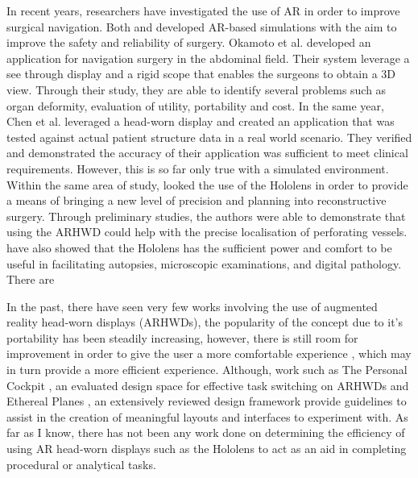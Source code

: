 In recent years, researchers have investigated the use of AR in order to improve surgical navigation. Both \cite{Okamoto2015} and \cite{Chen2015} developed AR-based simulations with the aim to improve the safety and reliability of surgery. Okamoto et al. developed an application for navigation surgery in the abdominal field. Their system leverage a see through display and a rigid scope that enables the surgeons to obtain a 3D view. Through their study, they are able to identify several problems such as organ deformity, evaluation of utility, portability and cost. In the same year, Chen et al. leveraged a head-worn display and created an application that was tested against actual patient structure data in a real world scenario. They verified and demonstrated the accuracy of their application was sufficient to meet clinical requirements. However, this is so far only true with a simulated environment. Within the same area of study, \cite{Pratt2018} looked the use of the Hololens in order to provide a means of bringing a new level of precision and planning into reconstructive surgery. Through preliminary studies, the authors were able to demonstrate that using the ARHWD could help with the precise localisation of perforating vessels. \cite{Hanna2018} have also showed that the Hololens has the sufficient power and comfort to be useful in facilitating autopsies, microscopic examinations, and digital pathology. There are 

In the past, there have seen very few works involving the use of augmented reality head-worn displays (ARHWDs), the popularity of the concept due to it's portability has been steadily increasing, however, there is still room for improvement in order to give the user a more comfortable experience \cite{Velamkayala2017}, which may in turn provide a more efficient experience. Although, work such as The Personal Cockpit \cite{Ens2014}, an evaluated design space for effective task switching on ARHWDs and Ethereal Planes \cite{Ens2014a}, an extensively reviewed design framework provide guidelines to assist in the creation of meaningful layouts and interfaces to experiment with. As far as I know, there has not been any work done on determining the efficiency of using AR head-worn displays such as the Hololens to act as an aid in completing procedural or analytical tasks. 

